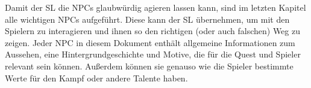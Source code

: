 Damit der SL die NPCs glaubwürdig agieren lassen kann, sind im letzten Kapitel alle wichtigen NPCs aufgeführt. Diese kann der SL übernehmen, um mit den Spielern zu interagieren und ihnen so den richtigen (oder auch falschen) Weg zu zeigen. Jeder NPC in diesem Dokument enthält allgemeine Informationen zum Aussehen, eine Hintergrundgeschichte und Motive, die für die Quest und Spieler relevant sein können. Außerdem können sie genauso wie die Spieler bestimmte Werte für den Kampf oder andere Talente haben.